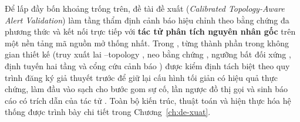 Để lấp đầy bốn khoảng trống trên, đề tài đề xuất \textbf{\CTAV{}} (\emph{Calibrated Topology-Aware Alert Validation}) làm tầng thẩm định cảnh báo hiệu chỉnh theo bằng chứng đa phương thức và kết nối trực tiếp với \textbf{tác tử phân tích nguyên nhân gốc} trên một nền tảng mã nguồn mở thống nhất. Trong \CTAV{}, từng thành phần trong không gian thiết kế (truy xuất lai --topology , neo bằng chứng , ngưỡng bất đối xứng , định tuyến hai tầng  và cổng cứu cảnh báo ) được kiểm định tách biệt theo quy trình đăng ký giả thuyết trước để giữ lại cấu hình tối giản có hiệu quả thực chứng, làm đầu vào sạch cho bước gom sự cố, lần ngược đồ thị gọi và sinh báo cáo có trích dẫn của tác tử . Toàn bộ kiến trúc, thuật toán và hiện thực hóa hệ thống được trình bày chi tiết trong Chương~\ref{ch:de-xuat}.

